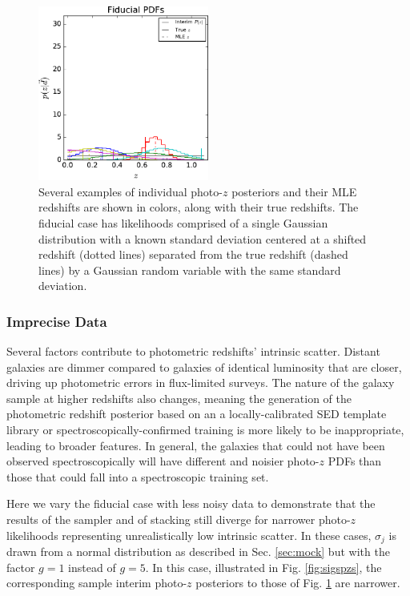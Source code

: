 \documentclass[preprint]{aastex}
\begin{document}
\begin{figure}
\includegraphics[width=0.5\textwidth]{figs/null/samplepzs.pdf}
\caption{Several examples of individual photo-$z$ posteriors and their MLE 
redshifts are shown in colors, along with their true redshifts.  The fiducial 
case has likelihoods comprised of a single Gaussian distribution with a known 
standard deviation centered at a shifted redshift (dotted lines) separated from 
the true redshift (dashed lines) by a Gaussian random variable with the same 
standard deviation.}
\label{fig:nullpzs}
\end{figure}

\subsubsection{Imprecise Data}
\label{sec:imprecision}

Several factors contribute to photometric redshifts' intrinsic scatter.  
Distant galaxies are dimmer compared to galaxies of identical luminosity that 
are closer, driving up photometric errors in flux-limited surveys.  The nature 
of the galaxy sample at higher redshifts also changes, meaning the generation 
of the photometric redshift posterior based on an a locally-calibrated SED 
template library or spectroscopically-confirmed training is more likely to be 
inappropriate, leading to broader features.  In general, the galaxies that 
could not have been observed spectroscopically will have different and noisier 
photo-$z$ PDFs than those that could fall into a spectroscopic training set.

Here we vary the fiducial case with less noisy data to demonstrate that the 
results of the sampler and of stacking still diverge for narrower photo-$z$ 
likelihoods representing unrealistically low intrinsic scatter.  In these 
cases, $\sigma_{j}$ is drawn from a normal distribution as described in Sec. 
\ref{sec:mock} but with the factor $g=1$ instead of $g=5$.  In this case, 
illustrated in Fig. \ref{fig:sigspzs}, the corresponding sample interim 
photo-$z$ posteriors to those of Fig. \ref{fig:nullpzs} are narrower.
\end{document}
